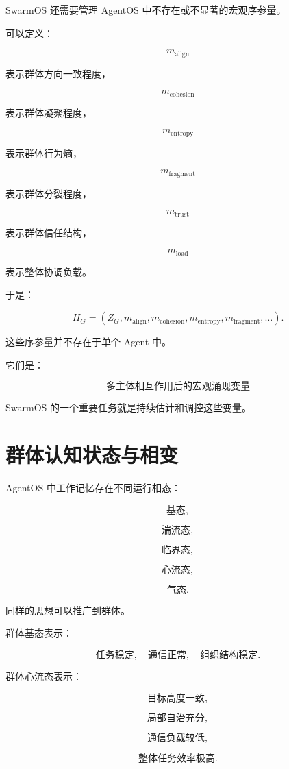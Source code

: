 SwarmOS 还需要管理 AgentOS 中不存在或不显著的宏观序参量。

可以定义：

\[
m_{\mathrm{align}}
\]

表示群体方向一致程度，

\[
m_{\mathrm{cohesion}}
\]

表示群体凝聚程度，

\[
m_{\mathrm{entropy}}
\]

表示群体行为熵，

\[
m_{\mathrm{fragment}}
\]

表示群体分裂程度，

\[
m_{\mathrm{trust}}
\]

表示群体信任结构，

\[
m_{\mathrm{load}}
\]

表示整体协调负载。

于是：

\[
H_G
=
\left(
Z_G,
m_{\mathrm{align}},
m_{\mathrm{cohesion}},
m_{\mathrm{entropy}},
m_{\mathrm{fragment}},
\dots
\right).
\]

这些序参量并不存在于单个 Agent 中。

它们是：

\[
\boxed{
\text{多主体相互作用后的宏观涌现变量}
}
\]

SwarmOS 的一个重要任务就是持续估计和调控这些变量。


\section{群体认知状态与相变}

AgentOS 中工作记忆存在不同运行相态：

\[
\text{基态},
\]

\[
\text{湍流态},
\]

\[
\text{临界态},
\]

\[
\text{心流态},
\]

\[
\text{气态}.
\]

同样的思想可以推广到群体。

群体基态表示：

\[
\text{任务稳定},
\quad
\text{通信正常},
\quad
\text{组织结构稳定}.
\]

群体心流态表示：

\[
\text{目标高度一致},
\]

\[
\text{局部自治充分},
\]

\[
\text{通信负载较低},
\]

\[
\text{整体任务效率极高}.
\]

